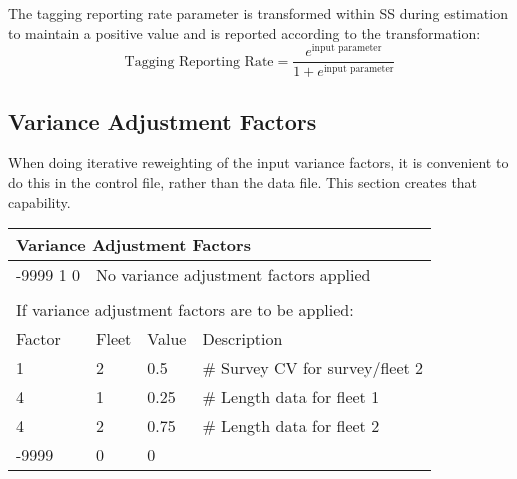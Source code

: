 \noindent The tagging reporting rate parameter is transformed within SS during estimation to maintain a positive value and is reported according to the transformation:
\begin{equation}
	\text{Tagging Reporting Rate} = \frac{e^{\text{input parameter}}}{1+e^{\text{input parameter}}}
\end{equation}

\hypertarget{GcompVar}{}
\subsection{Variance Adjustment Factors}
When doing iterative reweighting of the input variance factors, it is convenient to do this in the control file, rather than the data file.  This section creates that capability.

\pagebreak
\begin{center}
	\begin{longtable}{p{3cm} p{3cm} p{3cm} p{6.5cm} }

		 \multicolumn{4}{l}{Variance Adjustment Factors }\\
		 \hline
		-9999 1 0 & \multicolumn{3}{l}{No variance adjustment factors applied }\\
		\\
		\multicolumn{4}{l}{If variance adjustment factors are to be applied:}\\
		\hline
		Factor & Fleet & Value & Description \\
		\hline
		1 & 2 & 0.5 & \# Survey CV for survey/fleet 2 \\
		4 & 1 & 0.25 & \# Length data for fleet 1 \\
		4 & 2 & 0.75 & \# Length data for fleet 2\\
		-9999 & 0 & 0 & \\
		\hline
	\end{longtable}
\end{center}

